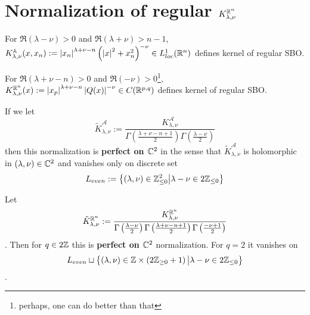 \documentclass[8pt,pdf,notes]{beamer}
\newcommand{\A}{\mathcal{A}}
\theoremstyle{mystyle}
\begin{document}
\section{Normalization of regular $K_{\lambda,\nu}^{\mathbb{R}^{n}}$}
\begin{frame}
	\begin{theorem}
		For $\Re(\lambda-\nu)>0$ and $\Re(\lambda+\nu)>n-1$, $K_{\lambda,\nu}^{\mathbb{A}}(x,x_n):=\left|x_n\right|^{\lambda+\nu-n}
		\left( \left|x\right|^2+x_n^2 \right)^{-\nu}\in L_{loc}^1(\mathbb{R}^n)$ defines kernel of regular SBO.
		\label{}
	\end{theorem}
	\begin{theorem}[$G:=O(p+1,q+1),\;n:=p+q$]
		For $\Re(\lambda+\nu-n)>0$ and $\Re(-\nu)>0$\footnote{perhaps, one can do better than that},
		$K^{\mathbb{R}^n}_{\lambda,\nu}(x):=\left|x_p\right|^{\lambda+\nu-n}\left|Q(x)\right|^{-\nu
		}\in C(\mathbb{R}^{p,q})$ defines kernel of regular SBO. 
		\label{}
	\end{theorem}
\end{frame}
\begin{frame}
	\begin{theorem}
		If we let \[\tilde{K}_{\lambda,\nu}^{\A}:=\frac{
			K_{\lambda,\nu}^{\A}}{\Gamma\left( \frac{\lambda+\nu-n+1}{2} \right)\Gamma
		\left( \frac{\lambda-\nu}{2} \right)}\] then this normalization is {\bf perfect on $\mathbb{C}^2$} in the sense
		that $\tilde{K}_{\lambda,\nu}^{\A}$ is holomorphic in $(\lambda,\nu)\in\mathbb{C}^2$ and vanishes only on discrete
		set \[L_{even}:=\left\{(\lambda,\nu)\in\mathbb{Z}_{\le0}^2\big| \lambda-\nu\in2\mathbb{Z}_{\le0}\right\}\]
		\label{}
	\end{theorem}
	\begin{theorem}[$G:=O(p+1,q+1),\;n:=p+q$]
		Let \[\tilde{K}_{\lambda,\nu}^{\mathbb{R}^n}:=\frac{K_{\lambda,\nu}^{\mathbb{R}^n}}{\Gamma\left( \frac{\lambda-\nu}{2} \right)
		\Gamma\left( \frac{\lambda+\nu-n+1}{2} \right)\Gamma\left( \frac{-\nu+1}{2} \right)}\]. Then for $q\in2\mathbb{Z}$
		this is {\bf perfect on $\mathbb{C}^2$} normalization. For $q=2$ it vanishes on \[L_{even}\sqcup\left\{(\lambda,\nu)\in\mathbb{Z}\times
		\left( 2\mathbb{Z}_{\ge0}+1 \right)\big| \lambda-\nu\in2\mathbb{Z}_{\le0}\right\}\].
		\label{}
	\end{theorem}
\end{frame}
\end{document}
